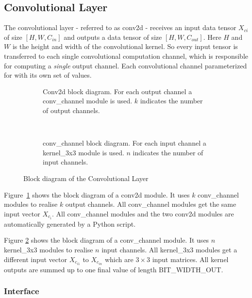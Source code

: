 \subsection{Convolutional Layer}

The convolutional layer - referred to as conv2d - receives an input data tensor $X_{ci} $ of size $[H, W, C_{in}]$ and outputs a data tensor of size $[H,W,C_{out}]$. Here $H$ and $W$ is the height and width of the convolutional kernel. So every input tensor is transferred to each single convolutional computation channel, which is responsible for computing a \emph{single} output channel. Each convolutional channel parameterized for with its own set of values.

\begin{figure}[h]
	\centering
	\begin{subfigure}[t]{0.5\textwidth}
		\centering
		
		\caption[Conv2d block diagram.]{Conv2d block diagram. For each output channel a conv\_channel module is used. $k$ indicates the number of output channels.}
		\label{fig:conv2d}
	\end{subfigure}%
	~
	\begin{subfigure}[t]{0.5\textwidth}
		\centering
		
		\caption[conv\_channel block diagram.]{conv\_channel block diagram. For each input channel a kernel\_3x3 module is used. $n$ indicates the number of input channels.}
		\label{fig:conv-channel}		
	\end{subfigure}
	\caption{Block diagram of the Convolutional Layer}
	\label{fig:hw-layer-conv}
\end{figure}


Figure~\ref{fig:conv2d} shows the block diagram of a conv2d module. It uses $k$ conv\_channel modules to realise $k$ output channels. All conv\_channel modules get the same input vector $X_{c_i}$. All conv\_channel modules and the two conv2d modules are automatically generated by a Python script.

Figure \ref{fig:conv-channel} shows the block diagram of a conv\_channel module. It uses $n$ kernel\_3x3 modules to realise $n$ input channels. All kernel\_3x3 modules get a different input vector $X_{c_{i1}}$ to $X_{c_{in}}$ which are $3 \times 3$ input matrices. All kernel outputs are summed up to one final value of length BIT\_WIDTH\_OUT.

\subsubsection{Interface}

